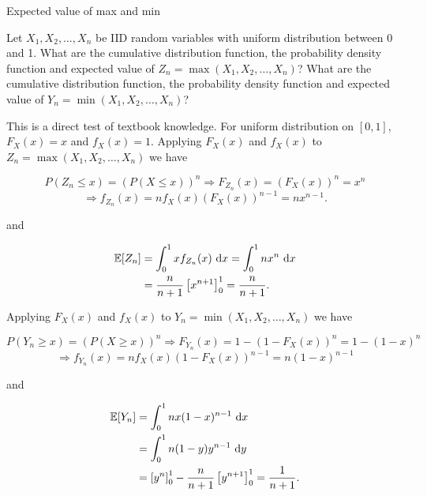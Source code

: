\begin{problem}{Expected value of max and min}

Let $X_1,X_2,\ldots,X_n$ be IID random variables with uniform distribution between 0 and
1. What are the cumulative distribution function, the probability density function and
expected value of $Z_n=\max(X_1,X_2,\ldots,X_n)$? What are the cumulative distribution
function, the probability density function and expected value of
$Y_n=\min(X_1,X_2,\ldots,X_n)$?

\end{problem}
\begin{solution}
This is a direct test of textbook knowledge. For uniform distribution on $[0,1]$,
$F_X(x)=x$ and $f_X(x)=1$. Applying $F_X(x)$ and $f_X(x)$ to
$Z_n=\max(X_1,X_2,\ldots,X_n)$ we have

\[
P(Z_n\leq x)=(P(X\leq x))^n\Rightarrow F_{Z_n}(x)=(F_X(x))^n=x^n
\]
\[
\Rightarrow f_{Z_n}(x)=nf_X(x)(F_X(x))^{n-1}=nx^{n-1}.
\]


and

\[
\begin{aligned}
\mathbb{E}[Z_n]&=\int_0^1xf_{Z_n}(x)\,\mathop{}\!\mathrm{d} x=\int_0^1nx^n\,\mathop{}\!\mathrm{d} x\\
&=\frac{n}{n+1}\left[x^{n+1}\right]_0^1=\frac{n}{n+1}.
\end{aligned}
\]

Applying $F_X(x)$ and $f_X(x)$ to $Y_n=\min(X_1,X_2,\ldots,X_n)$ we have

\[
P(Y_n\geq x)=(P(X\geq x))^n\Rightarrow F_{Y_n}(x)=1-(1-F_X(x))^n=1-(1-x)^n
\]
\[
\Rightarrow f_{Y_n}(x)=nf_X(x)(1-F_X(x))^{n-1}=n(1-x)^{n-1}
\]

and

\[
\begin{aligned}
\mathbb{E}[Y_n]&=\int_0^1nx(1-x)^{n-1}\,\mathop{}\!\mathrm{d} x\\
&=\int_0^1n(1-y)y^{n-1}\,\mathop{}\!\mathrm{d} y\\
&=\left[y^n\right]_0^1-\frac{n}{n+1}\left[y^{n+1}\right]_0^1=\frac{1}{n+1}.
\end{aligned}
\]
\end{solution}

